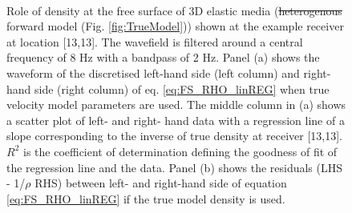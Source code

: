 \documentclass{article} %
\providecommand{\DIFaddtex}[1]{{\protect\color{blue}\uwave{#1}}} %
\providecommand{\DIFdeltex}[1]{{\protect\color{red}\sout{#1}}}                      %
\providecommand{\DIFaddFL}[1]{\DIFadd{#1}} %
\providecommand{\DIFdelFL}[1]{\DIFdel{#1}} %
\providecommand{\DIFaddbeginFL}{} %
\providecommand{\DIFaddendFL}{} %
\providecommand{\DIFdelbeginFL}{} %
\providecommand{\DIFdelendFL}{} %
\providecommand{\DIFadd}[1]{\texorpdfstring{\DIFaddtex{#1}}{#1}} %
\providecommand{\DIFdel}[1]{\texorpdfstring{\DIFdeltex{#1}}{}} %
\newcommand{\DIFscaledelfig}{0.5}
\newlength{\DIFdelgraphicswidth} %
\newlength{\DIFdelgraphicsheight} %
\newcommand{\DIFaddincludegraphics}[2][]{{\color{blue}\fbox{\DIFOincludegraphics[#1]{#2}}}} %
\newcommand{\DIFdelincludegraphics}[2][]{%
\sbox{\DIFdelgraphicsbox}{\DIFOincludegraphics[#1]{#2}}%
\settoboxwidth{\DIFdelgraphicswidth}{\DIFdelgraphicsbox} %
\settoboxtotalheight{\DIFdelgraphicsheight}{\DIFdelgraphicsbox} %
\scalebox{\DIFscaledelfig}{%
\parbox[b]{\DIFdelgraphicswidth}{\usebox{\DIFdelgraphicsbox}\\[-\baselineskip] \rule{\DIFdelgraphicswidth}{0em}}\llap{\resizebox{\DIFdelgraphicswidth}{\DIFdelgraphicsheight}{%
\setlength{\unitlength}{\DIFdelgraphicswidth}%
\begin{picture}(1,1)%
\thicklines\linethickness{2pt} %
{\color[rgb]{1,0,0}\put(0,0){\framebox(1,1){}}}%
{\color[rgb]{1,0,0}\put(0,0){\line( 1,1){1}}}%
{\color[rgb]{1,0,0}\put(0,1){\line(1,-1){1}}}%
\end{picture}%
}\hspace*{3pt}}} %
} %
\DeclareRobustCommand{\DIFaddbeginFL}{\DIFOaddbeginFL \let\includegraphics\DIFaddincludegraphics} %
\DeclareRobustCommand{\DIFaddendFL}{\DIFOaddendFL \let\includegraphics\DIFOincludegraphics} %
\DeclareRobustCommand{\DIFdelbeginFL}{\DIFOdelbeginFL \let\includegraphics\DIFdelincludegraphics} %
\DeclareRobustCommand{\DIFdelendFL}{\DIFOaddendFL \let\includegraphics\DIFOincludegraphics} %
\begin{document}
	\begin{figure}[H] \centering
		\begin{subfigure}[t]{0.8\linewidth}
			\centering
		\end{subfigure}\\
		\begin{subfigure}[t]{0.8\linewidth}
			\centering
		\end{subfigure}
	\caption{Role of density at the free surface of 3D elastic media (\DIFdelbeginFL \DIFdelFL{heterogenous }\DIFdelendFL \DIFaddbeginFL \DIFaddFL{heterogeneous }\DIFaddendFL forward model (Fig. \ref{fig:TrueModel})) shown at the example receiver at location [13,13]. The wavefield is filtered around a central frequency of 8 Hz with a bandpass of 2 Hz. Panel (a) shows the waveform of the discretised left-hand side (left column) and right-hand side (right column) of eq. \eqref{eq:FS_RHO_linREG} when true velocity model parameters are used. The middle column in (a) shows a scatter plot of left- and right- hand data with a regression line of a slope corresponding to the inverse of true density at receiver [13,13]. $R^{2}$ is the coefficient of determination defining the goodness of fit of the regression line and the data. Panel (b) shows the residuals (LHS - 1/$\rho$ RHS) between left- and right-hand side of equation \eqref{eq:FS_RHO_linREG} if the true model density is used.}
	\label{fig:signal_rho_ELASTIC}	
	\end{figure}
\end{document}
